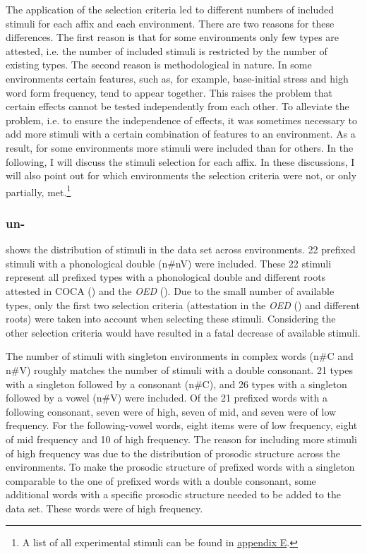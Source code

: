  

The application of the selection criteria led to different numbers of included stimuli for each affix and each environment. 
There are two reasons for these differences. The first reason is that for some environments only few types are attested, i.e. the number of included stimuli is restricted by the number of existing types. The second reason is methodological in nature. 
In some environments 
certain features, such as, for example, base-initial stress and high word form frequency, tend to appear together. This raises the problem that certain effects cannot be tested independently from each other. To alleviate the problem, i.e. to ensure the independence of effects, it was sometimes necessary to add more stimuli with a certain combination of features to an environment. As a result, for some environments more stimuli were included than for others. 
In the following, I will discuss the stimuli selection for each affix. In these discussions, I will also point out for which environments the selection criteria were not, or only partially, met.\footnote{A list of all experimental stimuli can be found in \hyperref[Appendix E: Stimuli of Experimental Study]{appendix E}.} 


\subsubsection{un-}

 shows the distribution of  stimuli in the data set across environments. 
22  prefixed stimuli with a phonological double ({n\#nV}) were included. These 22 stimuli represent all prefixed types with a phonological double and different roots attested in COCA (\citealt{Davies.20082014}) and the \textit{OED} (\citealt{OED.2013}). 
Due to the small number of available types, only the first two selection criteria (attestation in the \textit{OED} (\citealt{OED.2013}) and different roots) were taken into account when selecting these stimuli. Considering the other selection criteria would have resulted in a fatal decrease of available stimuli. 



The number of stimuli with singleton environments in complex words (n\#C and n\#V) roughly matches the number of stimuli with a double consonant. 21 types with a  singleton followed by a consonant ({n\#C}), and 26 types with a singleton followed by a vowel ({n\#V}) were included. 
Of the 21 prefixed words with a following consonant, seven were of high, seven of mid, and seven were of low frequency.
For the following-vowel words, eight items were of low frequency, eight of mid frequency and 10 of high frequency. The reason for including more stimuli of high frequency was due to the distribution of prosodic structure across the environments. To make the prosodic structure of prefixed words with a singleton comparable to the one of prefixed words with a double consonant, some additional words with a specific prosodic structure needed to be added to the data set. These words were of high frequency.




